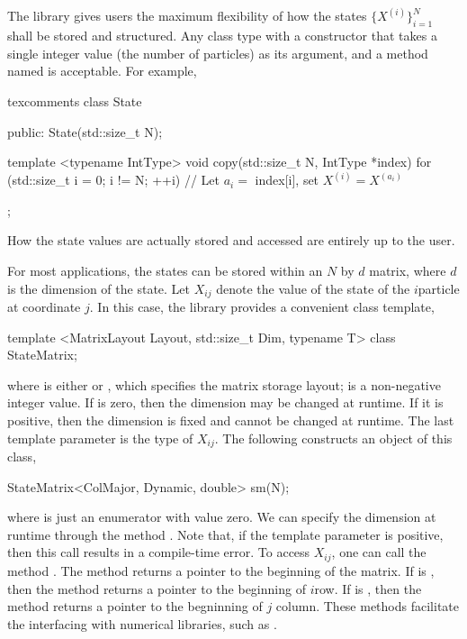 The library gives users the maximum flexibility of how the states
$\{X^{(i)}\}_{i=1}^N$ shall be stored and structured. Any class type with a
constructor that takes a single integer value (the number of particles) as its
argument, and a method named  is acceptable. For example,
\begin{cppcode*}{texcomments}
  class State
  {
    public:
    State(std::size_t N);

    template <typename IntType>
    void copy(std::size_t N, IntType *index)
    {
      for (std::size_t i = 0; i != N; ++i) {
        // Let $a_i =$ index[i], set $X^{(i)} = X^{(a_i)}$
      }
    }
  };
\end{cppcode*}
How the state values are actually stored and accessed are entirely up to the
user.

For most applications, the states can be stored within an $N$ by $d$ matrix,
where $d$ is the dimension of the state. Let $X_{ij}$ denote the value of the
state of the $i$\ith particle at coordinate $j$. In this case, the library
provides a convenient class template,
\begin{cppcode}
  template <MatrixLayout Layout, std::size_t Dim, typename T>
  class StateMatrix;
\end{cppcode}
where  is either  or
, which specifies the matrix storage layout;
 is a non-negative integer value. If  is zero,
then the dimension may be changed at runtime. If it is positive, then the
dimension is fixed and cannot be changed at runtime. The last template
parameter  is the \cpp type of $X_{ij}$. The following constructs
an object of this class,
\begin{cppcode}
  StateMatrix<ColMajor, Dynamic, double> sm(N);
\end{cppcode}
where  is just an enumerator with value zero. We can specify
the dimension at runtime through the method . Note
that, if the template parameter  is positive, then this call
results in a compile-time error. To access $X_{ij}$, one can call the method
. The method  returns a pointer
to the beginning of the matrix. If  is ,
then the method  returns a pointer to the beginning
of $i$\ith row. If  is , then the method
 returns a pointer to the begninning of $j$\ith
column. These methods facilitate the interfacing with numerical libraries, such
as \blas.

